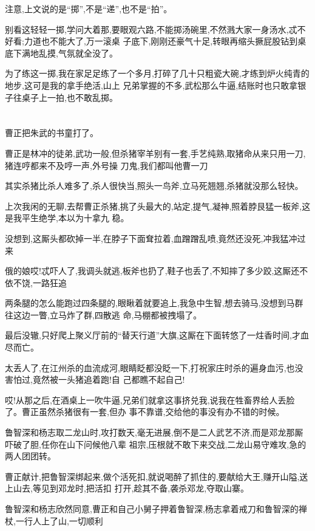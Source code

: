 ﻿\documentclass[12pt]{article}
\begin{document}
注意,上文说的是``掷'',不是``递'',也不是``拍''。

别看这轻轻一掷,学问大着那,要眼观六路,不能掷汤碗里,不然溅大家一身汤水,忒不好看;力道也不能大了,万一滚桌
子底下,刚刚还豪气十足,转眼再缩头撅屁股钻到桌底下满地乱摸,气氛就全没了。

为了练这一掷,我在家足足练了一个多月,打碎了几十只粗瓷大碗,才练到炉火纯青的地步,这可是我的拿手绝活,山上
兄弟掌握的不多,武松那么牛逼,结账时也只敢拿银子往桌子上一拍,也不敢乱掷。

\section{}

曹正把朱武的书童打了。

曹正是林冲的徒弟,武功一般,但杀猪宰羊别有一套,手艺纯熟,取猪命从来只用一刀,猪连哼都来不及哼一声,外号操
刀鬼,我们都叫他曹一刀

其实杀猪比杀人难多了,杀人很快当,照头一鸟斧,立马死翘翘,杀猪就没那么轻快。

上次我闲的无聊,去帮曹正杀猪,挑了头最大的,站定,提气,凝神,照着脖艮猛一板斧,这是我平生绝学,本以为十拿九
稳。

没想到,这厮头都砍掉一半,在脖子下面耷拉着,血蹭蹭乱喷,竟然还没死,冲我猛冲过来

俄的娘哎!忒吓人了,我调头就逃,板斧也扔了,鞋子也丢了,不知摔了多少跤,这厮还不依不饶,一路狂追

两条腿的怎么能跑过四条腿的,眼瞅着就要追上,我急中生智,想去骑马,没想到马群往这边一瞥,立马炸了群,四散逃
命,马棚都被拽塌了。

最后没辙,只好爬上聚义厅前的``替天行道''大旗,这厮在下面转悠了一炷香时间,才血尽而亡。

太丢人了,在江州杀的血流成河,眼睛眨都没眨一下,打祝家庄时杀的遍身血污,也没害怕过,竟然被一头猪追着跑!自
己都瞧不起自己!

哎!从那之后,在酒桌上一吹牛逼,兄弟们就拿这事挤兑我,说我在牲畜界给人丢脸了。曹正虽然杀猪很有一套,但办
事不靠谱,交给他的事没有办不错的时候。

鲁智深和杨志取二龙山时,攻打数天,毫无进展,倒不是二人武艺不济,而是邓龙那厮吓破了胆,任你在山下问候他八辈
祖宗,压根就不敢下来交战,二龙山易守难攻,急的两人团团转。

曹正献计,把鲁智深绑起来,做个活死扣,就说喝醉了抓住的,要献给大王,赚开山隘,送上山去,等见到邓龙时,把活扣
打开,趁其不备,袭杀邓龙,夺取山寨。

鲁智深和杨志欣然同意,曹正和自己小舅子押着鲁智深,杨志拿着戒刀和鲁智深的禅杖,一行人上了山,一切顺利
\end{document}

